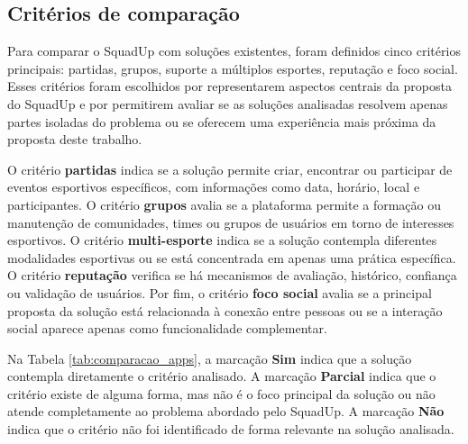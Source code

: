 \documentclass[a4paper, 12pt]{article}
\begin{document}
\begin{justify}
\subsection{Critérios de comparação}

Para comparar o SquadUp com soluções existentes, foram definidos cinco critérios principais: partidas, grupos, suporte a múltiplos esportes, reputação e foco social. Esses critérios foram escolhidos por representarem aspectos centrais da proposta do SquadUp e por permitirem avaliar se as soluções analisadas resolvem apenas partes isoladas do problema ou se oferecem uma experiência mais próxima da proposta deste trabalho.

O critério \textbf{partidas} indica se a solução permite criar, encontrar ou participar de eventos esportivos específicos, com informações como data, horário, local e participantes. O critério \textbf{grupos} avalia se a plataforma permite a formação ou manutenção de comunidades, times ou grupos de usuários em torno de interesses esportivos. O critério \textbf{multi-esporte} indica se a solução contempla diferentes modalidades esportivas ou se está concentrada em apenas uma prática específica. O critério \textbf{reputação} verifica se há mecanismos de avaliação, histórico, confiança ou validação de usuários. Por fim, o critério \textbf{foco social} avalia se a principal proposta da solução está relacionada à conexão entre pessoas ou se a interação social aparece apenas como funcionalidade complementar.

Na Tabela \ref{tab:comparacao_apps}, a marcação \textbf{Sim} indica que a solução contempla diretamente o critério analisado. A marcação \textbf{Parcial} indica que o critério existe de alguma forma, mas não é o foco principal da solução ou não atende completamente ao problema abordado pelo SquadUp. A marcação \textbf{Não} indica que o critério não foi identificado de forma relevante na solução analisada.

\begin{table}[H]
\centering
\caption{Comparação entre soluções analisadas}
\label{tab:comparacao_apps}
\end{table}


\end{justify}
\end{document}
